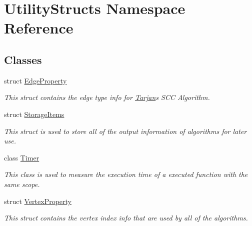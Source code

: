 \hypertarget{namespace_utility_structs}{}\section{Utility\+Structs Namespace Reference}
\label{namespace_utility_structs}
\subsection*{Classes}
\begin{DoxyCompactItemize}
\item 
struct \hyperlink{struct_utility_structs_1_1_edge_property}{Edge\+Property}
\begin{DoxyCompactList}\small\item\em This struct contains the edge type info for \hyperlink{class_tarjan}{Tarjan}\textquotesingle{}s S\+CC Algorithm. \end{DoxyCompactList}\item 
struct \hyperlink{struct_utility_structs_1_1_storage_items}{Storage\+Items}
\begin{DoxyCompactList}\small\item\em This struct is used to store all of the output information of algorithms for later use. \end{DoxyCompactList}\item 
class \hyperlink{class_utility_structs_1_1_timer}{Timer}
\begin{DoxyCompactList}\small\item\em This class is used to measure the execution time of a executed function with the same scope. \end{DoxyCompactList}\item 
struct \hyperlink{struct_utility_structs_1_1_vertex_property}{Vertex\+Property}
\begin{DoxyCompactList}\small\item\em This struct contains the vertex index info that are used by all of the algorithms. \end{DoxyCompactList}\end{DoxyCompactItemize}
